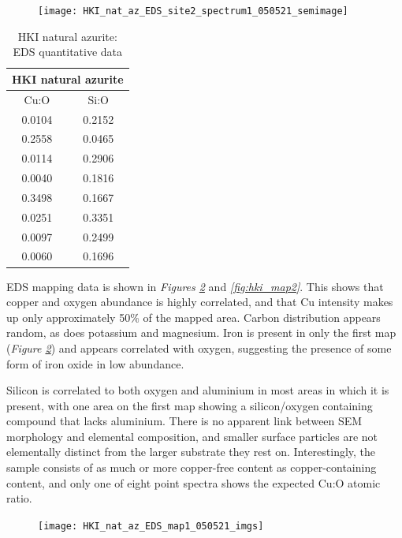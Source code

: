 \begin{figure}[H]
\centering
  \texttt{[image: HKI\_nat\_az\_EDS\_site2\_spectrum1\_050521\_semimage]}
\label{fig:hki_eds_semimage}
\end{figure}

\begin{table}[H]
\caption{HKI natural azurite: EDS quantitative data}
\centering
\label{table:hki_ratios}
\begin{tabular}{c c}
\toprule
\multicolumn{2}{c}{HKI natural azurite} \\
\midrule
Cu:O & Si:O \\
\midrule
0.0104 & 0.2152 \\
0.2558 & 0.0465 \\
0.0114 & 0.2906 \\
0.0040 & 0.1816 \\
0.3498 & 0.1667 \\
0.0251 & 0.3351  \\
0.0097 & 0.2499 \\
0.0060 & 0.1696 \\
\bottomrule
\end{tabular}
\end{table}

EDS mapping data is shown in \textit{Figures \ref{fig:hki_map1}} and \textit{\ref{fig:hki_map2}}. This shows that copper and oxygen abundance is highly correlated, and that Cu intensity makes up only approximately 50\% of the mapped area. Carbon distribution appears random, as does potassium and magnesium. Iron is present in only the first map (\textit{Figure \ref{fig:hki_map1}}) and appears correlated with oxygen, suggesting the presence of some form of iron oxide in low abundance. 

Silicon is correlated to both oxygen and aluminium in most areas in which it is present, with one area on the first map showing a silicon/oxygen containing compound that lacks aluminium. There is no apparent link between SEM morphology and elemental composition, and smaller surface particles are not elementally distinct from the larger substrate they rest on. Interestingly, the sample consists of as much or more copper-free content as copper-containing content, and only one of eight point spectra shows the expected Cu:O atomic ratio. 

\begin{figure}[H]
\centering
  \texttt{[image: HKI\_nat\_az\_EDS\_map1\_050521\_imgs]}
\label{fig:hki_map1}
\end{figure}

